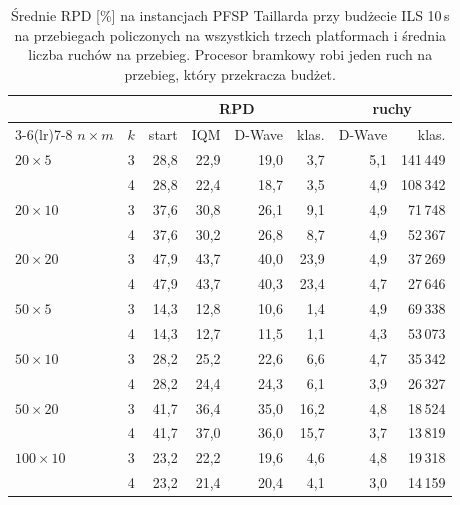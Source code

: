 \documentclass[letterpaper]{article} %
\theoremstyle{definition}
\begin{document}
\begin{table}[t]
\centering
\small
\setlength{\tabcolsep}{3pt}
\begin{tabular}{@{}lcrrrrrr@{}}
\toprule
 & & \multicolumn{4}{c}{RPD} & \multicolumn{2}{c}{ruchy} \\
\cmidrule(lr){3-6}\cmidrule(lr){7-8}
$n\times m$ & $k$ & start & IQM & D-Wave & klas. & D-Wave & klas. \\
\midrule
$20\times 5$   & 3 & 28,8 & 22,9 & 19,0 & 3,7  & 5,1 & 141\,449 \\
               & 4 & 28,8 & 22,4 & 18,7 & 3,5  & 4,9 & 108\,342 \\
$20\times 10$  & 3 & 37,6 & 30,8 & 26,1 & 9,1  & 4,9 & 71\,748 \\
               & 4 & 37,6 & 30,2 & 26,8 & 8,7  & 4,9 & 52\,367 \\
$20\times 20$  & 3 & 47,9 & 43,7 & 40,0 & 23,9 & 4,9 & 37\,269 \\
               & 4 & 47,9 & 43,7 & 40,3 & 23,4 & 4,7 & 27\,646 \\
$50\times 5$   & 3 & 14,3 & 12,8 & 10,6 & 1,4  & 4,9 & 69\,338 \\
               & 4 & 14,3 & 12,7 & 11,5 & 1,1  & 4,3 & 53\,073 \\
$50\times 10$  & 3 & 28,2 & 25,2 & 22,6 & 6,6  & 4,7 & 35\,342 \\
               & 4 & 28,2 & 24,4 & 24,3 & 6,1  & 3,9 & 26\,327 \\
$50\times 20$  & 3 & 41,7 & 36,4 & 35,0 & 16,2 & 4,8 & 18\,524 \\
               & 4 & 41,7 & 37,0 & 36,0 & 15,7 & 3,7 & 13\,819 \\
$100\times 10$ & 3 & 23,2 & 22,2 & 19,6 & 4,6  & 4,8 & 19\,318 \\
               & 4 & 23,2 & 21,4 & 20,4 & 4,1  & 3,0 & 14\,159 \\
\bottomrule
\end{tabular}
\caption{Średnie RPD [\%] na instancjach PFSP Taillarda przy budżecie ILS 10\,s na przebiegach policzonych na
wszystkich trzech platformach i średnia liczba ruchów na przebieg.
Procesor bramkowy robi jeden ruch na przebieg, który przekracza budżet.}
\label{tab:quantum}
\end{table}
\end{document}
